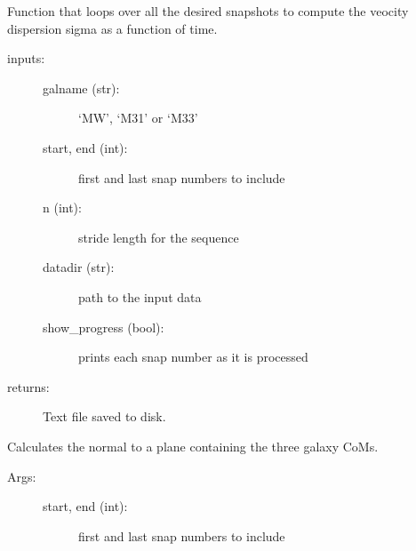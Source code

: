 \documentclass[letterpaper,10pt,english]{sphinxmanual}
\begin{document}
\begin{fulllineitems}
\begin{fulllineitems}
\label{\detokenize{timecourse:galaxy.timecourse.TimeCourse.write_vel_disp}}
Function that loops over all the desired snapshots to compute the veocity dispersion
sigma as a function of time.
\begin{description}
\item[{inputs:}] \leavevmode\begin{description}
\item[{galname (str):}] \leavevmode
‘MW’, ‘M31’ or ‘M33’

\item[{start, end (int):}] \leavevmode
first and last snap numbers to include

\item[{n (int):}] \leavevmode
stride length for the sequence

\item[{datadir (str):}] \leavevmode
path to the input data

\item[{show\_progress (bool):}] \leavevmode
prints each snap number as it is processed

\end{description}

\item[{returns: }] \leavevmode
Text file saved to disk.

\end{description}

\end{fulllineitems}


\begin{fulllineitems}
\label{\detokenize{timecourse:galaxy.timecourse.TimeCourse.write_LG_normal}}
Calculates the normal to a plane containing the three galaxy CoMs.
\begin{description}
\item[{Args:}] \leavevmode\begin{description}
\item[{start, end (int):}] \leavevmode
first and last snap numbers to include


\end{description}
\end{description}
\end{fulllineitems}
\end{fulllineitems}
\end{document}
